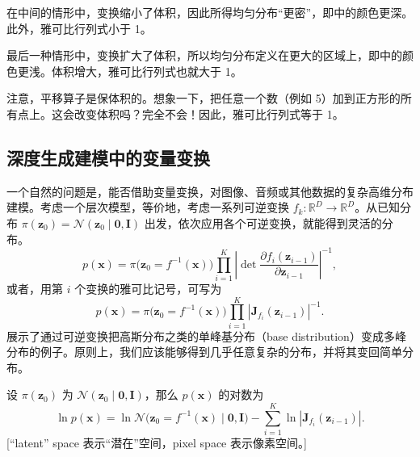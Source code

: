 在中间的情形中，变换缩小了体积，因此所得均匀分布“更密”，即中的颜色更深。此外，雅可比行列式小于 1。

最后一种情形中，变换扩大了体积，所以均匀分布定义在更大的区域上，即中的颜色更浅。体积增大，雅可比行列式也就大于 1。

注意，平移算子是保体积的。想象一下，把任意一个数（例如 5）加到正方形的所有点上。这会改变体积吗？完全不会！因此，雅可比行列式等于 1。


\subsection{深度生成建模中的变量变换}

一个自然的问题是，能否借助变量变换，对图像、音频或其他数据的复杂高维分布建模。考虑一个层次模型，等价地，考虑一系列可逆变换 $f_k\colon\mathbb{R}^D\to\mathbb{R}^D$。从已知分布 $\pi(\mathbf{z}_0)=\mathcal{N}(\mathbf{z}_0\mid\mathbf{0},\mathbf{I})$ 出发，依次应用各个可逆变换，就能得到灵活的分布。
\begin{equation}
p(\mathbf{x})=\pi\bigl(\mathbf{z}_0=f^{-1}(\mathbf{x})\bigr)
\prod_{i=1}^K\left|\det\frac{\partial f_i(\mathbf{z}_{i-1})}{\partial\mathbf{z}_{i-1}}\right|^{-1},
\tag{4.12}\label{eq:04-12}
\end{equation}
或者，用第 $i$ 个变换的雅可比记号，可写为
\begin{equation}
p(\mathbf{x})=\pi\bigl(\mathbf{z}_0=f^{-1}(\mathbf{x})\bigr)
\prod_{i=1}^K\left|\mathbf{J}_{f_i}(\mathbf{z}_{i-1})\right|^{-1}.
\tag{4.13}\label{eq:04-13}
\end{equation}
展示了通过可逆变换把高斯分布之类的单峰基分布（base distribution）变成多峰分布的例子。原则上，我们应该能够得到几乎任意复杂的分布，并将其变回简单分布。

设 $\pi(\mathbf{z}_0)$ 为 $\mathcal{N}(\mathbf{z}_0\mid\mathbf{0},\mathbf{I})$，那么 $p(\mathbf{x})$ 的对数为
\begin{equation}
\ln p(\mathbf{x})=\ln\mathcal{N}\bigl(\mathbf{z}_0=f^{-1}(\mathbf{x})\mid\mathbf{0},\mathbf{I}\bigr)
-\sum_{i=1}^K\ln\left|\mathbf{J}_{f_i}(\mathbf{z}_{i-1})\right|.
\tag{4.14}\label{eq:04-14}
\end{equation}
[“latent” space 表示“潜在”空间，pixel space 表示像素空间。]

